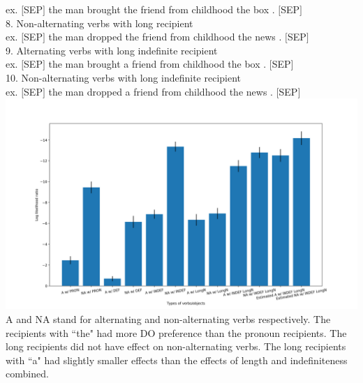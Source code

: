 \documentclass[twocolumn,dvipdfmx, 10pt]{article}
\begin{document}
ex. $[$SEP$]$ the man brought the friend from childhood the box . $[$SEP$]$\\
8. Non-alternating verbs with long recipient\\
ex. $[$SEP$]$ the man dropped the friend from childhood the news . $[$SEP$]$\\
9. Alternating verbs with long indefinite recipient\\
ex. $[$SEP$]$ the man brought a friend from childhood the box . $[$SEP$]$\\
10. Non-alternating verbs with long indefinite recipient\\
ex. $[$SEP$]$ the man dropped a friend from childhood the news . $[$SEP$]$\\
\includegraphics[keepaspectratio,width = \linewidth]{sent_probs_new.png}
A and NA stand for alternating and non-alternating verbs respectively.  The recipients with ``the" had more DO preference than the pronoun recipients.  The long recipients did not have effect on non-alternating verbs.  The long recipients with ``a" had slightly smaller effects than the effects of length and indefiniteness combined.
\end{document}
